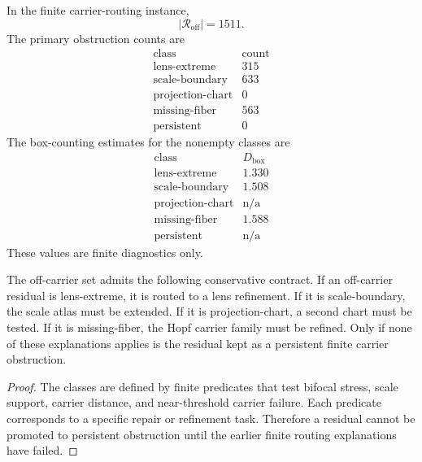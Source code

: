 \begin{remark}
In the finite carrier-routing instance,
\[
    |\mathcal R_{\mathrm{off}}|=1511.
\]
The primary obstruction counts are
\[
\begin{array}{c|r}
\text{class} & \text{count}\\
\hline
\mathrm{lens\text{-}extreme} & 315\\
\mathrm{scale\text{-}boundary} & 633\\
\mathrm{projection\text{-}chart} & 0\\
\mathrm{missing\text{-}fiber} & 563\\
\mathrm{persistent} & 0
\end{array}
\]
The box-counting estimates for the nonempty classes are
\[
\begin{array}{c|c}
\text{class} & D_{\mathrm{box}}\\
\hline
\mathrm{lens\text{-}extreme} & 1.330\\
\mathrm{scale\text{-}boundary} & 1.508\\
\mathrm{projection\text{-}chart} & \text{n/a}\\
\mathrm{missing\text{-}fiber} & 1.588\\
\mathrm{persistent} & \text{n/a}
\end{array}
\]
These values are finite diagnostics only.
\end{remark}

\begin{theorem}
The off-carrier set admits the following conservative contract.  If an
off-carrier residual is lens-extreme, it is routed to a lens refinement.  If it
is scale-boundary, the scale atlas must be extended.  If it is projection-chart,
a second chart must be tested.  If it is missing-fiber, the Hopf carrier family
must be refined.  Only if none of these explanations applies is the residual
kept as a persistent finite carrier obstruction.
\end{theorem}

\begin{proof}
The classes are defined by finite predicates that test bifocal stress, scale
support, carrier distance, and near-threshold carrier failure.  Each predicate
corresponds to a specific repair or refinement task.  Therefore a residual
cannot be promoted to persistent obstruction until the earlier finite routing
explanations have failed.
\end{proof}


